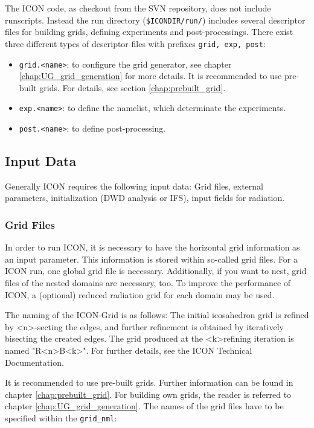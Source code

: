 The ICON code, as checkout from the SVN repository, does not include runscripts. Instead the run directory (\verb+$ICONDIR/run/+) includes several descriptor files for building grids, defining experiments and post-processings. There exist three different types of descriptor files with prefixes \verb+grid, exp, post+:

\begin{itemize}
 \item \verb+grid.<name>+: to configure the grid generator, see chapter \ref{chap:UG_grid_generation} for more details. It is recommended to use pre-built grids. For details, see section \ref{chap:prebuilt_grid}.
 \item \verb+exp.<name>+: to define the namelist, which determinate the experiments.
 \item \verb+post.<name>+: to define post-processing.
\end{itemize}

\subsection{Input Data}

Generally ICON requires the following input data: Grid files, external parameters, initialization (DWD analysis or IFS), input fields for radiation.

\subsubsection{Grid Files}\label{sec:grid_input}

In order to run ICON, it is necessary to have the horizontal grid information as an input parameter. This information is stored within so-called grid files. For a ICON run, one global grid file is necessary. Additionally, if you want to nest, grid files of the nested domains are necessary, too. To improve the performance of ICON, a (optional) reduced radiation grid for each domain may be used. 

The naming of the ICON-Grid is as follows: The initial icosahedron grid is refined by \textless n\textgreater -secting the edges, and further refinement is obtained by iteratively bisecting the created edges. The grid produced at the \textless k\textgreater refining iteration is named "R\textless n\textgreater B\textless k\textgreater". For further details, see the ICON Technical Documentation.

It is recommended to use pre-built grids. Further information can be found in chapter \ref{chap:prebuilt_grid}. For building own grids, the reader is referred to chapter \ref{chap:UG_grid_generation}. The names of the grid files have to be specified within the \verb+grid_nml+:

